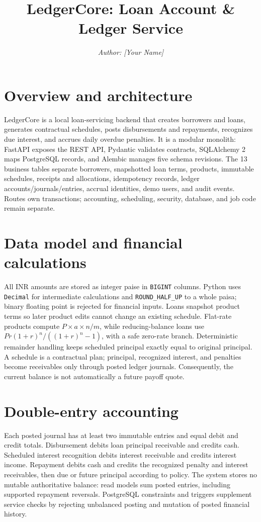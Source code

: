 \documentclass[10pt,a4paper]{article}
\title{\vspace{-1.4cm}\textbf{LedgerCore: Loan Account \& Ledger Service}}
\author{\textit{Author: [Your Name]}}
\date{}
\begin{document}
\maketitle
\vspace{-1.15cm}

\section{Overview and architecture}
LedgerCore is a local loan-servicing backend that creates borrowers and loans, generates
contractual schedules, posts disbursements and repayments, recognizes due interest, and
accrues daily overdue penalties. It is a modular monolith: FastAPI exposes the REST API,
Pydantic validates contracts, SQLAlchemy 2 maps PostgreSQL records, and Alembic manages five
schema revisions. The 13 business tables separate borrowers, snapshotted loan terms,
products, immutable schedules, receipts and allocations, idempotency records, ledger
accounts/journals/entries, accrual identities, demo users, and audit events. Routes own
transactions; accounting, scheduling, security, database, and job code remain separate.

\section{Data model and financial calculations}
All INR amounts are stored as integer paise in \texttt{BIGINT} columns. Python uses
\texttt{Decimal} for intermediate calculations and \texttt{ROUND\_HALF\_UP} to a whole
paisa; binary floating point is rejected for financial inputs. Loans snapshot product terms
so later product edits cannot change an existing schedule. Flat-rate products compute
\(P \times a \times n/m\), while reducing-balance loans use
\(P r(1+r)^n/((1+r)^n-1)\), with a safe zero-rate branch. Deterministic remainder handling
keeps scheduled principal exactly equal to original principal. A schedule is a contractual
plan; principal, recognized interest, and penalties become receivables only through posted
ledger journals. Consequently, the current balance is not automatically a future payoff quote.

\section{Double-entry accounting}
Each posted journal has at least two immutable entries and equal debit and credit totals.
Disbursement debits loan principal receivable and credits cash. Scheduled interest recognition
debits interest receivable and credits interest income. Repayment debits cash and credits the
recognized penalty and interest receivables, then due or future principal according to policy.
The system stores no mutable authoritative balance: read models sum posted entries, including
supported repayment reversals. PostgreSQL constraints and triggers supplement service checks
by rejecting unbalanced posting and mutation of posted financial history.
\end{document}
